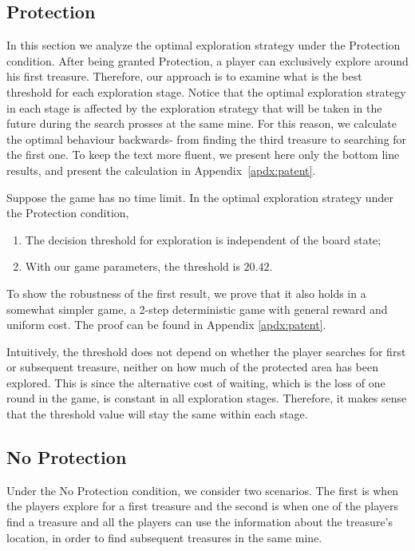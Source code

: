 \subsection{Protection}

In this section we analyze the optimal exploration strategy under the Protection condition. After being granted Protection, a player can exclusively explore around his first treasure. Therefore, our approach is to examine what is the best threshold for each exploration stage. Notice that the optimal exploration strategy in each stage is affected by the exploration strategy that will be taken in the future during the search prosses at the same mine. For this reason, we calculate the optimal behaviour backwards- from finding the third treasure to searching for the first one.   To keep the text more fluent, we present here only the bottom line results, and present the calculation in Appendix~\ref{apdx:patent}.

\begin{prop}
Suppose the game has no time limit.  In the optimal exploration strategy under the Protection condition,
\begin{enumerate}
\item The decision threshold for exploration is independent of the board state;
\item    With our game parameters, the threshold is $20.42$.
\end{enumerate} 
\end{prop}
To show the robustness of the first result, we prove that it also holds in a somewhat simpler game, a 2-step deterministic game with general reward and uniform cost. The proof can be found in Appendix \ref{apdx:patent}.

Intuitively, the threshold does not depend on whether the player searches for first or subsequent treasure, neither on how much of the protected area has been explored.  This is since the alternative cost of waiting, which is the loss of one round in the game, is constant in all exploration stages. Therefore, it makes sense that the threshold value will stay the same within each stage. 


\subsection{No Protection}
Under the No Protection condition, we consider two scenarios. The first is when the players explore for a first treasure and the second is when one of the players find a treasure and all the players can use the information about the treasure's location, in order to find subsequent treasures in the same mine. 

